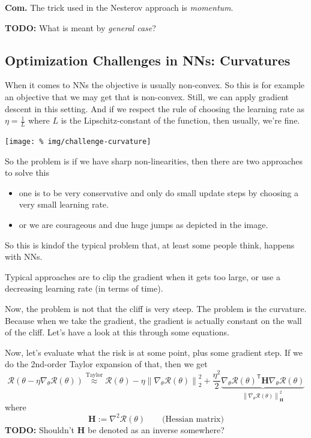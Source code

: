 \documentclass[a2paper,8pt]{extarticle}
\newcommand{\cR}{\mathcal{R}}
\newcommand{\norm}[1]{\left\lVert #1 \right\rVert}
\newcommand*{\T}{\mathsf{T}}
\newcommand{\mat}[1]{\mathbf{#1}}
\newcommand{\MH}{\mat{H}}
\newcommand{\todo}[1]{\textbf{TODO:} #1}
\newcommand{\todo}[1]{%
}
\newcommand{\Com}{\textbf{Com.} }
\begin{document}
\begin{landscape}
\begin{multicols*}{7}
\Com The trick used in the Nesterov approach is \emph{momentum}.

\todo{What is meant by \emph{general case}?}

\subsection{Optimization Challenges in NNs: Curvatures}

When it comes to NNs the objective is usually non-convex. So this is for example
an objective that we may get that is non-convex. Still, we can apply gradient
descent in this setting. And if we respect the rule of choosing the learning
rate as $\eta=\frac{1}{L}$ where $L$ is the Lipschitz-constant of the function,
then usually, we're fine.

\begin{center}
  \texttt{[image: \%
img/challenge-curvature]}
\end{center}

So the problem is if we have sharp non-linearities, then there are two
approaches to solve this
\begin{itemize}
  \item one is to be very conservative and only do small update steps by
  choosing a very small learning rate.
  \item or we are courageous and due huge jumps as depicted in the image.
\end{itemize}
So this is kindof the typical problem that, at least some people think, happens
with NNs.

Typical approaches are to clip the gradient when it gets too large, or use a
decreasing learning rate (in terms of time).

Now, the problem is not that the cliff is very steep. The problem is the
curvature. Because when we take the gradient, the gradient is actually constant
on the wall of the cliff. Let's have a look at this through some equations.

Now, let's evaluate what the risk is at some point, plus some gradient step. If
we do the 2nd-order Taylor expansion of that, then we get
\[
\cR(\theta-\eta\nabla_{\theta}\cR(\theta))
\stackrel{\text{Taylor}}{\approx}
\cR(\theta)
-\eta\norm{\nabla_\theta\cR(\theta)}_2^2
+
\frac{\eta^2}{2}
\underbrace{
\nabla_{\theta}\cR(\theta)^\T\MH
\nabla_{\theta}\cR(\theta)
}_{\norm{\nabla_\theta\cR(\theta)}_{\MH}^2}
\]
where
\[
\MH:=\nabla^2\cR(\theta)
\qquad
\text{(Hessian matrix)}
\]
\todo{Shouldn't $\MH$ be denoted as an inverse somewhere?} 


\end{multicols*}
\end{landscape}
\end{document}
